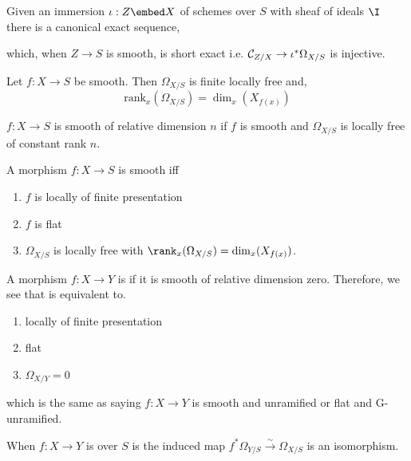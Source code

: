 \documentclass[12pt]{article}
\begin{document}
\begin{prop}
Given an immersion $\iota : Z \embed X$ of schemes over $S$ with sheaf of ideals $\I$ there is a canonical exact sequence,
\begin{center}
\end{center}
which, when $Z \to S$ is smooth, is short exact i.e. $\mathcal{C}_{Z/X} \to \iota^* \Omega_{X/S}$ is injective.
\end{prop}

\begin{prop}
Let $f : X \to S$ be smooth. Then $\Omega_{X/S}$ is finite locally free and,
\[ \mathrm{rank}_x(\Omega_{X/S}) = \dim_x (X_{f(x)}) \]
\end{prop}

\begin{defn}
$f : X \to S$ is smooth of relative dimension $n$ if $f$ is smooth and $\Omega_{X/S}$ is locally free of constant rank $n$. 
\end{defn}

\begin{prop}
A morphism $f : X \to S$ is smooth iff 
\begin{enumerate}
\item $f$ is locally of finite presentation
\item $f$ is flat
\item $\Omega_{X/S}$ is locally free with $\rank_x(\Omega_{X/S}) = \dim_x(X_{f(x)})$. 
\end{enumerate}
\end{prop}

\begin{defn}
A morphism $f : X \to Y$ is \textit{\etale} if it is smooth of relative dimension zero. Therefore, we see that \etale is equivalent to.
\begin{enumerate}
\item locally of finite presentation
\item flat
\item $\Omega_{X/Y} = 0$
\end{enumerate}
which is the same as saying $f : X \to Y$ is smooth and unramified or flat and G-unramified.
\end{defn}

\begin{prop}
When $f : X \to Y$ is over $S$ is \etale the induced map $f^* \Omega_{Y/S} \xrightarrow{\sim} \Omega_{X/S}$ is an isomorphism.
\end{prop}
\end{document}
